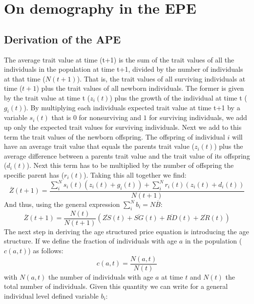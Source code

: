 \newcommand{\avav}[3]{\overline{#1}(#3)\;\overline{#2}(#3)}
\newcommand{\cov}[2]{\text{cov}(#1,#2)}
\newcommand{\ages}{\sum_{a=1}^{\omega}}
\section{On demography in the EPE}
\label{app:ape2}
\subsection{Derivation of the APE}
The average trait value at time (t+1) is the sum of the trait values of all the individuals in the population at time t+1, divided by the number of individuals at that time ($N(t+1)$). That is, the trait values of all surviving individuals at time ($t+1$) plus the trait values of all newborn individuals. The former is given by the trait value at time t ($z_i(t)$) plus the growth of the individual at time t ($g_i(t)$). By multiplying each individuals expected trait value at time t+1 by a variable $s_i(t)$ that is $0$ for nonsurviving and $1$ for surviving individuals, we add up only the expected trait values for surviving individuals. Next we add to this term the trait values of the newborn offspring. The offspring of individual $i$ will have an average trait value that equals the parents trait value ($z_i(t)$) plus the average difference between a parents trait value and the trait value of its offspring ($d_i(t)$). Next this term has to be multiplied by the number of offspring the specific parent has ($r_i(t)$). Taking this all together we find:
\begin{equation}
\overline{Z}(t+1) = \frac{\sum_i^N s_i(t) \left( z_i(t) + g_i(t) \right) + \sum_i^N r_i(t) \left( z_i(t) + d_i(t) \right)}{N(t+1)}
\end{equation}
And thus, using the general expression $\sum_i^N b_i = N\overline{B}$:
\begin{equation}
\overline{Z}(t+1) = \frac{N(t)}{N(t+1)} \left( \overline{ZS}(t) + \overline{SG}(t) + \overline{RD}(t) + \overline{ZR}(t) \right)
\label{appape1}
\end{equation}
The next step in deriving the age structured price equation is introducing the age structure. If we define the fraction of individuals with age $a$ in the population ($c(a,t)$) as follows:
\begin{equation}
c(a,t) = \frac{N(a,t)}{N(t)}
\end{equation}
with $N(a,t)$ the number of individuals with age $a$ at time $t$ and $N(t)$ the total number of individuals. Given this quantity we can write for a general individual level defined variable $b_i$:
